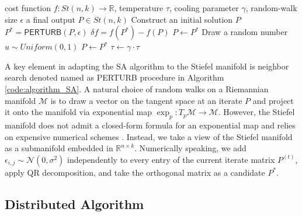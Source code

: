 \documentclass[11pt]{article}
\begin{document}
\begin{algorithm}[ht]
	\caption{Simulated Annealing on the Stiefel Manifold}
	\label{code:algorithm_SA}
	\begin{algorithmic}
		\REQUIRE cost function $f:St(n,k) \rightarrow \mathbb{R}$, temperature $\tau$, cooling parameter $\gamma$, random-walk size $\epsilon$
		\ENSURE a final output $P \in St(n,k)$
		\STATE Construct an initial solution $P$ 
		\STATE $P^* = \textsf{PERTURB}(P, \epsilon)$
		\STATE $\delta f = f(P^*) - f(P)$
		\STATE $P \leftarrow P^*$
		\ELSE 
		\STATE Draw a random number $u \sim Uniform(0,1)$
		\STATE $P \leftarrow P^*$
		\ENDIF
		\ENDIF
		\STATE $\tau \leftarrow \gamma \cdot \tau$
		\ENDWHILE
	\end{algorithmic}
\end{algorithm}

A key element in adapting the SA algorithm to the Stiefel manifold is neighbor search denoted named as \textsf{PERTURB} procedure in Algorithm \ref{code:algorithm_SA}. A natural choice of random walks on a Riemannian manifold $\mathcal{M}$ is to draw a vector on the tangent space at an iterate $P$ and project it onto the manifold via exponential map $\exp_p : T_p \mathcal{M} \rightarrow \mathcal{M}$. However, the Stiefel manifold does not admit a closed-form formula for an exponential map and relies on expensive numerical schemes \citep{zimmermann_matrix-algebraic_2017-1}. Instead, we take a view of the Stiefel manifold as a submanifold embedded in $\mathbb{R}^{n\times k}$. Numerically speaking, we add $\epsilon_{i,j} \sim \mathcal{N}(0, \sigma^2)$ independently to every entry of the current iterate matrix $P^{(t)}$, apply QR decomposition, and take the orthogonal matrix as a candidate $P^*$.

\subsection{Distributed Algorithm}
\end{document}
